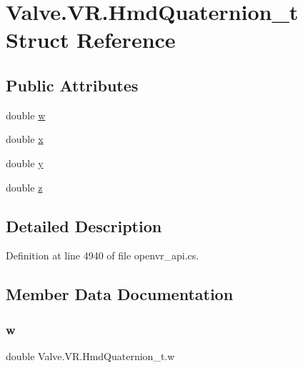 \hypertarget{struct_valve_1_1_v_r_1_1_hmd_quaternion__t}{}\section{Valve.\+V\+R.\+Hmd\+Quaternion\+\_\+t Struct Reference}
\label{struct_valve_1_1_v_r_1_1_hmd_quaternion__t}
\subsection*{Public Attributes}
\begin{DoxyCompactItemize}
\item 
double \mbox{\hyperlink{struct_valve_1_1_v_r_1_1_hmd_quaternion__t_abde50c05fbbe966908d60af470ec4c6d}{w}}
\item 
double \mbox{\hyperlink{struct_valve_1_1_v_r_1_1_hmd_quaternion__t_abe6f358b7f19defef34ee6fa452d5c2b}{x}}
\item 
double \mbox{\hyperlink{struct_valve_1_1_v_r_1_1_hmd_quaternion__t_a1c9ceb112eb4ca504f5218065ae142fe}{y}}
\item 
double \mbox{\hyperlink{struct_valve_1_1_v_r_1_1_hmd_quaternion__t_af414f9d15465669e77fa015630832a52}{z}}
\end{DoxyCompactItemize}


\subsection{Detailed Description}


Definition at line 4940 of file openvr\+\_\+api.\+cs.



\subsection{Member Data Documentation}
\mbox{\label{struct_valve_1_1_v_r_1_1_hmd_quaternion__t_abde50c05fbbe966908d60af470ec4c6d}} 
\subsubsection{\texorpdfstring{w}{w}}
{\footnotesize\ttfamily double Valve.\+V\+R.\+Hmd\+Quaternion\+\_\+t.\+w}




